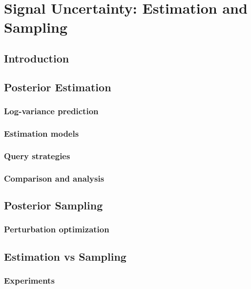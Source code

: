 \chapter{Signal Uncertainty: Estimation and Sampling} %

\label{chap:variance} %



\section{Introduction}

\label{sec:var_intro}


\section{Posterior Estimation}

\subsection{Log-variance prediction}

\subsection{Estimation models}

\subsection{Query strategies}

\subsection{Comparison and analysis}


\section{Posterior Sampling}

\label{sec:sampling}

\subsection{Perturbation optimization}



\section{Estimation vs Sampling}

\subsection{Experiments}


